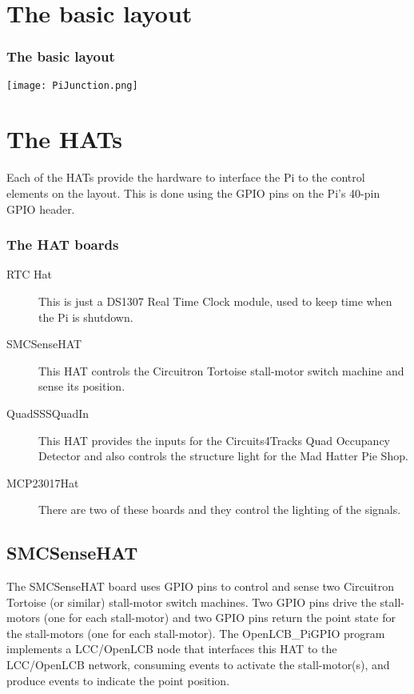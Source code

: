 \documentclass[ignorenonframetext]{beamer}
\begin{document}
\section{The basic layout}

\begin{frame}
   \frametitle{The basic layout}
   \texttt{[image: PiJunction.png]}
\end{frame}

\section{The HATs}

Each of the HATs provide the hardware to interface the Pi to the control
elements on the layout. This is done using the GPIO pins on the Pi's 40-pin
GPIO header.  

\begin{frame}
   \frametitle{The HAT boards}
   \begin{description}
   \item[RTC Hat] This is just a DS1307 Real Time Clock module, used to keep 
   time when the Pi is shutdown.
   \item[SMCSenseHAT] This HAT controls the Circuitron Tortoise stall-motor 
   switch machine and sense its position.
   \item[QuadSSSQuadIn] This HAT provides the inputs for the Circuits4Tracks 
   Quad Occupancy Detector and also controls the structure light for the Mad 
   Hatter Pie Shop.
   \item[MCP23017Hat] There are two of these boards and they control the 
   lighting of the signals.
   \end{description}
\end{frame}

\subsection{SMCSenseHAT}

The SMCSenseHAT board uses GPIO pins to control and sense two Circuitron
Tortoise (or similar) stall-motor switch machines. Two GPIO pins drive the
stall-motors (one for each stall-motor) and two GPIO pins return the point
state for the stall-motors (one for each stall-motor). The OpenLCB\_PiGPIO
program implements a LCC/OpenLCB node that interfaces this HAT to the
LCC/OpenLCB network, consuming events to activate the stall-motor(s), and
produce events to indicate the point position.
\end{document}
